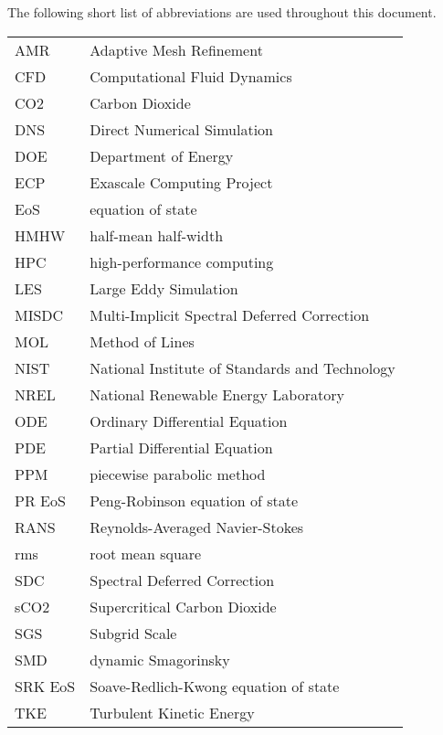 \documentclass[11pt,expanded,copyright]{fsuthesis}
\begin{document}
\begin{listofabbrevs}
The following short list of abbreviations are used throughout this document. 
\begin{center}
\begin{tabular}{ll}
AMR& Adaptive Mesh Refinement \\
CFD& Computational Fluid Dynamics \\
CO2& Carbon Dioxide \\
DNS& Direct Numerical Simulation \\
DOE& Department of Energy \\
ECP& Exascale Computing Project \\
EoS& equation of state \\
HMHW& half-mean half-width \\
HPC& high-performance computing \\
LES& Large Eddy Simulation \\
MISDC& Multi-Implicit Spectral Deferred Correction \\
MOL& Method of Lines \\
NIST& National Institute of Standards and Technology \\
NREL& National Renewable Energy Laboratory \\
ODE& Ordinary Differential Equation \\
PDE& Partial Differential Equation \\
PPM& piecewise parabolic method \\
PR EoS& Peng-Robinson equation of state \\
RANS& Reynolds-Averaged Navier-Stokes \\
rms& root mean square \\
SDC& Spectral Deferred Correction \\
sCO2& Supercritical Carbon Dioxide \\
SGS& Subgrid Scale \\
SMD& dynamic Smagorinsky \\
SRK EoS& Soave-Redlich-Kwong equation of state \\
TKE& Turbulent Kinetic Energy \\



\end{tabular}
\end{center}
\end{listofabbrevs}
\end{document}
